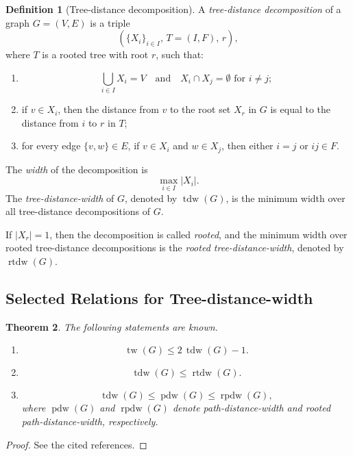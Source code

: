 \documentclass[10pt]{book}
\newtheorem{theorem}{Theorem}[section]
\theoremstyle{definition}
\newtheorem{definition}[theorem]{Definition}
\begin{document}
\begin{definition}[Tree-distance decomposition]
\cite{57}
A \emph{tree-distance decomposition} of a graph \(G=(V,E)\) is a triple
\[
(\{X_i\}_{i\in I},\,T=(I,F),\,r),
\]
where \(T\) is a rooted tree with root \(r\), such that:
\begin{enumerate}
    \item
    \[
    \bigcup_{i\in I} X_i = V
    \quad\text{and}\quad
    X_i\cap X_j=\emptyset \text{ for } i\neq j;
    \]
    \item if \(v\in X_i\), then the distance from \(v\) to the root set \(X_r\) in \(G\) is equal to the distance from \(i\) to \(r\) in \(T\);
    \item for every edge \(\{v,w\}\in E\), if \(v\in X_i\) and \(w\in X_j\), then either \(i=j\) or \(ij\in F\).
\end{enumerate}
The \emph{width} of the decomposition is
\[
\max_{i\in I}|X_i|.
\]
The \emph{tree-distance-width} of \(G\), denoted by \(\operatorname{tdw}(G)\), is the minimum width over all tree-distance decompositions of \(G\).

If \(|X_r|=1\), then the decomposition is called \emph{rooted}, and the minimum width over rooted tree-distance decompositions is the \emph{rooted tree-distance-width}, denoted by \(\operatorname{rtdw}(G)\).
\end{definition}

\subsection{Selected Relations for Tree-distance-width}

\begin{theorem}
The following statements are known.
\begin{enumerate}
    \item
    \[
    \operatorname{tw}(G)\leq 2\,\operatorname{tdw}(G)-1.
    \]
    \item
    \[
    \operatorname{tdw}(G)\leq \operatorname{rtdw}(G).
    \]
    \item
    \[
    \operatorname{tdw}(G)\leq \operatorname{pdw}(G)\leq \operatorname{rpdw}(G),
    \]
    where \(\operatorname{pdw}(G)\) and \(\operatorname{rpdw}(G)\) denote path-distance-width and rooted path-distance-width, respectively.
\end{enumerate}
\end{theorem}

\begin{proof}
See the cited references.
\end{proof}
\end{document}
